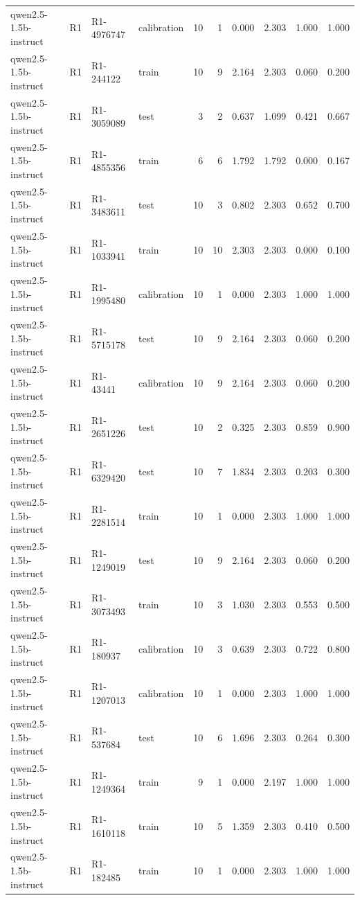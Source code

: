 \begin{table}
\begin{tabular}{llllrrrrrr}
qwen2.5-1.5b-instruct & R1 & R1-4976747 & calibration & 10 & 1 & 0.000 & 2.303 & 1.000 & 1.000 \\
qwen2.5-1.5b-instruct & R1 & R1-244122 & train & 10 & 9 & 2.164 & 2.303 & 0.060 & 0.200 \\
qwen2.5-1.5b-instruct & R1 & R1-3059089 & test & 3 & 2 & 0.637 & 1.099 & 0.421 & 0.667 \\
qwen2.5-1.5b-instruct & R1 & R1-4855356 & train & 6 & 6 & 1.792 & 1.792 & 0.000 & 0.167 \\
qwen2.5-1.5b-instruct & R1 & R1-3483611 & test & 10 & 3 & 0.802 & 2.303 & 0.652 & 0.700 \\
qwen2.5-1.5b-instruct & R1 & R1-1033941 & train & 10 & 10 & 2.303 & 2.303 & 0.000 & 0.100 \\
qwen2.5-1.5b-instruct & R1 & R1-1995480 & calibration & 10 & 1 & 0.000 & 2.303 & 1.000 & 1.000 \\
qwen2.5-1.5b-instruct & R1 & R1-5715178 & test & 10 & 9 & 2.164 & 2.303 & 0.060 & 0.200 \\
qwen2.5-1.5b-instruct & R1 & R1-43441 & calibration & 10 & 9 & 2.164 & 2.303 & 0.060 & 0.200 \\
qwen2.5-1.5b-instruct & R1 & R1-2651226 & test & 10 & 2 & 0.325 & 2.303 & 0.859 & 0.900 \\
qwen2.5-1.5b-instruct & R1 & R1-6329420 & test & 10 & 7 & 1.834 & 2.303 & 0.203 & 0.300 \\
qwen2.5-1.5b-instruct & R1 & R1-2281514 & train & 10 & 1 & 0.000 & 2.303 & 1.000 & 1.000 \\
qwen2.5-1.5b-instruct & R1 & R1-1249019 & test & 10 & 9 & 2.164 & 2.303 & 0.060 & 0.200 \\
qwen2.5-1.5b-instruct & R1 & R1-3073493 & train & 10 & 3 & 1.030 & 2.303 & 0.553 & 0.500 \\
qwen2.5-1.5b-instruct & R1 & R1-180937 & calibration & 10 & 3 & 0.639 & 2.303 & 0.722 & 0.800 \\
qwen2.5-1.5b-instruct & R1 & R1-1207013 & calibration & 10 & 1 & 0.000 & 2.303 & 1.000 & 1.000 \\
qwen2.5-1.5b-instruct & R1 & R1-537684 & test & 10 & 6 & 1.696 & 2.303 & 0.264 & 0.300 \\
qwen2.5-1.5b-instruct & R1 & R1-1249364 & train & 9 & 1 & 0.000 & 2.197 & 1.000 & 1.000 \\
qwen2.5-1.5b-instruct & R1 & R1-1610118 & train & 10 & 5 & 1.359 & 2.303 & 0.410 & 0.500 \\
qwen2.5-1.5b-instruct & R1 & R1-182485 & train & 10 & 1 & 0.000 & 2.303 & 1.000 & 1.000 \\

\end{tabular}
\end{table}
